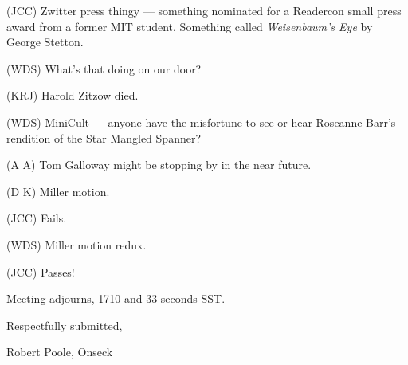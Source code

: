 (JCC) Zwitter press thingy --- something nominated for a Readercon small press
award from a former MIT student.  Something called {\em Weisenbaum's Eye\/} by
George Stetton.

(WDS) What's that doing on our door?

(KRJ) Harold Zitzow died.

(WDS) MiniCult --- anyone have the misfortune to see or hear Roseanne Barr's
rendition of the Star Mangled Spanner?

(A A) Tom Galloway might be stopping by in the near future.

(D K) Miller motion.

(JCC) Fails.

(WDS) Miller motion redux.

(JCC) Passes!

Meeting adjourns, 1710 and 33 seconds SST.

\vspace{0.15in}
\begin{center}
Respectfully submitted,

Robert Poole, Onseck
\end{center}

